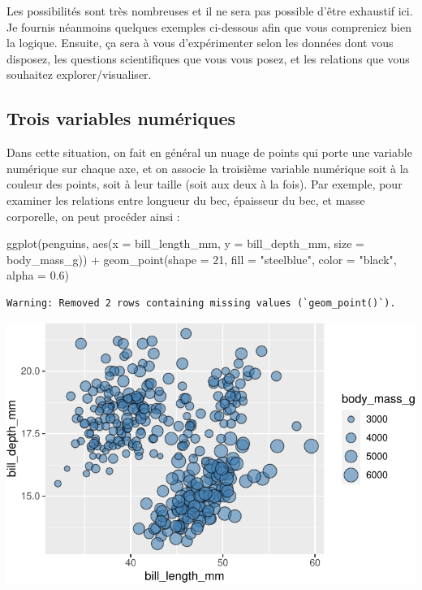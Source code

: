 \documentclass[
  a4paper,
  DIV=11,
  numbers=noendperiod,
  oneside]{scrreprt}
\newenvironment{Shaded}{}{}
\newcommand{\AttributeTok}[1]{\textcolor[rgb]{0.84,0.23,0.29}{#1}}
\newcommand{\DecValTok}[1]{\textcolor[rgb]{0.00,0.36,0.77}{#1}}
\newcommand{\FloatTok}[1]{\textcolor[rgb]{0.00,0.36,0.77}{#1}}
\newcommand{\FunctionTok}[1]{\textcolor[rgb]{0.44,0.26,0.76}{#1}}
\newcommand{\NormalTok}[1]{\textcolor[rgb]{0.14,0.16,0.18}{#1}}
\newcommand{\SpecialCharTok}[1]{\textcolor[rgb]{0.00,0.36,0.77}{#1}}
\newcommand{\StringTok}[1]{\textcolor[rgb]{0.01,0.18,0.38}{#1}}
\begin{document}
Les possibilités sont très nombreuses et il ne sera pas possible d'être
exhaustif ici. Je fournis néanmoins quelques exemples ci-dessous afin
que vous compreniez bien la logique. Ensuite, ça sera à vous
d'expérimenter selon les données dont vous disposez, les questions
scientifiques que vous vous posez, et les relations que vous souhaitez
explorer/visualiser.

\subsection{Trois variables
numériques}\label{trois-variables-numuxe9riques}

Dans cette situation, on fait en général un nuage de points qui porte
une variable numérique sur chaque axe, et on associe la troisième
variable numérique soit à la couleur des points, soit à leur taille
(soit aux deux à la fois). Par exemple, pour examiner les relations
entre longueur du bec, épaisseur du bec, et masse corporelle, on peut
procéder ainsi :

\begin{Shaded}
\begin{Highlighting}[]
\FunctionTok{ggplot}\NormalTok{(penguins, }\FunctionTok{aes}\NormalTok{(}\AttributeTok{x =}\NormalTok{ bill\_length\_mm, }\AttributeTok{y =}\NormalTok{ bill\_depth\_mm,}
                     \AttributeTok{size =}\NormalTok{ body\_mass\_g)) }\SpecialCharTok{+}
  \FunctionTok{geom\_point}\NormalTok{(}\AttributeTok{shape =} \DecValTok{21}\NormalTok{, }\AttributeTok{fill =} \StringTok{"steelblue"}\NormalTok{, }\AttributeTok{color =} \StringTok{"black"}\NormalTok{, }\AttributeTok{alpha =} \FloatTok{0.6}\NormalTok{)}
\end{Highlighting}
\end{Shaded}

\begin{verbatim}
Warning: Removed 2 rows containing missing values (`geom_point()`).
\end{verbatim}

\includegraphics{03-visualization_files/figure-pdf/unnamed-chunk-75-1.pdf}
\end{document}
